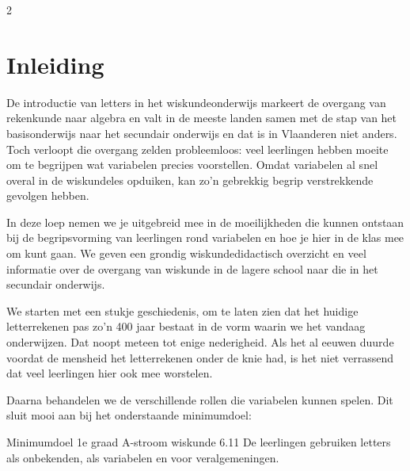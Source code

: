 

\startcontents[inhoudloep]

\begin{multicols}{2}
	
	\inhoudstafelloep			%


\section{Inleiding}
De introductie van letters in het wiskundeonderwijs markeert de overgang van rekenkunde naar algebra en valt in de meeste landen samen met de stap van het basisonderwijs naar het secundair onderwijs en dat is in Vlaanderen niet anders. Toch verloopt die overgang zelden probleemloos: veel leerlingen hebben moeite om te begrijpen wat variabelen precies voorstellen. Omdat variabelen al snel overal in de wiskundeles opduiken, kan zo’n gebrekkig begrip verstrekkende gevolgen hebben.

In deze loep nemen we je uitgebreid mee in de moeilijkheden die kunnen ontstaan bij de begripsvorming van leerlingen rond variabelen en hoe je hier in de klas mee om kunt gaan. We geven een grondig wiskundedidactisch overzicht en veel informatie over de overgang van wiskunde in de lagere school naar die in het secundair onderwijs. 

We starten met een stukje geschiedenis, om te laten zien dat het huidige letterrekenen pas zo’n 400 jaar bestaat in de vorm waarin we het vandaag onderwijzen. Dat noopt meteen tot enige nederigheid. Als het al eeuwen duurde voordat de mensheid het letterrekenen onder de knie had, is het niet verrassend dat veel leerlingen hier ook mee worstelen.

Daarna behandelen we de verschillende rollen die variabelen kunnen spelen. Dit sluit mooi aan bij het onderstaande minimumdoel:

\begin{kader}{Minimumdoel 1e graad A-stroom wiskunde}{} 6.11 De leerlingen gebruiken letters als onbekenden, als variabelen en voor veralgemeningen.
\end{kader}


\end{multicols}
